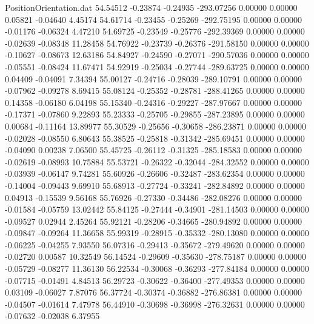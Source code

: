 \begin{filecontents}{PositionOrientation.dat}
  54.54512   -0.23874   -0.24935  -293.07256    0.00000    0.00000    0.05821   -0.04640    4.45174
  54.61714   -0.23455   -0.25269  -292.75195    0.00000    0.00000   -0.01176   -0.06324    4.47210
  54.69725   -0.23549   -0.25776  -292.39369    0.00000    0.00000   -0.02639   -0.08348   11.28458
  54.76922   -0.23739   -0.26376  -291.58150    0.00000    0.00000   -0.10627   -0.08673   12.63186
  54.84927   -0.24590   -0.27071  -290.57036    0.00000    0.00000   -0.05551   -0.08424   11.67471
  54.92919   -0.25034   -0.27744  -289.63725    0.00000    0.00000    0.04409   -0.04091    7.34394
  55.00127   -0.24716   -0.28039  -289.10791    0.00000    0.00000   -0.07962   -0.09278    8.69415
  55.08124   -0.25352   -0.28781  -288.41265    0.00000    0.00000    0.14358   -0.06180    6.04198
  55.15340   -0.24316   -0.29227  -287.97667    0.00000    0.00000   -0.17371   -0.07860    9.22893
  55.23333   -0.25705   -0.29855  -287.23895    0.00000    0.00000    0.00684   -0.11164   13.89977
  55.30529   -0.25656   -0.30658  -286.23871    0.00000    0.00000   -0.02028   -0.08550    6.80643
  55.38525   -0.25818   -0.31342  -285.69451    0.00000    0.00000   -0.04090    0.00238    7.06500
  55.45725   -0.26112   -0.31325  -285.18583    0.00000    0.00000   -0.02619   -0.08993   10.75884
  55.53721   -0.26322   -0.32044  -284.32552    0.00000    0.00000   -0.03939   -0.06147    9.74281
  55.60926   -0.26606   -0.32487  -283.62354    0.00000    0.00000   -0.14004   -0.09443    9.69910
  55.68913   -0.27724   -0.33241  -282.84892    0.00000    0.00000    0.04913   -0.15539    9.56168
  55.76926   -0.27330   -0.34486  -282.08276    0.00000    0.00000   -0.01584   -0.05759   13.02442
  55.84125   -0.27444   -0.34901  -281.14503    0.00000    0.00000   -0.09527    0.02944    2.45264
  55.92121   -0.28206   -0.34665  -280.94892    0.00000    0.00000   -0.09847   -0.09264   11.36658
  55.99319   -0.28915   -0.35332  -280.13080    0.00000    0.00000   -0.06225   -0.04255    7.93550
  56.07316   -0.29413   -0.35672  -279.49620    0.00000    0.00000   -0.02720    0.00587   10.32549
  56.14524   -0.29609   -0.35630  -278.75187    0.00000    0.00000   -0.05729   -0.08277   11.36130
  56.22534   -0.30068   -0.36293  -277.84184    0.00000    0.00000   -0.07715   -0.01491    4.84513
  56.29723   -0.30622   -0.36400  -277.49353    0.00000    0.00000    0.03109   -0.06027    7.87076
  56.37724   -0.30374   -0.36882  -276.86381    0.00000    0.00000   -0.04507   -0.01614    7.47978
  56.44910   -0.30698   -0.36998  -276.32631    0.00000    0.00000   -0.07632   -0.02038    6.37955

\end{filecontents}
